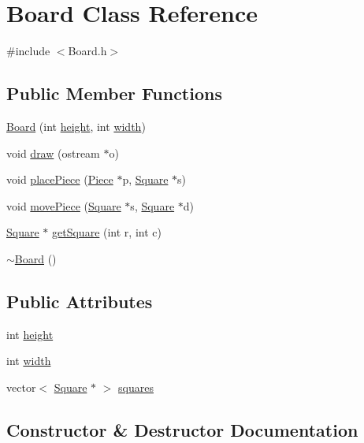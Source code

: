 \hypertarget{classBoard}{}\section{Board Class Reference}
\label{classBoard}


{\ttfamily \#include $<$Board.\+h$>$}

\subsection*{Public Member Functions}
\begin{DoxyCompactItemize}
\item 
\hyperlink{classBoard_a1291ca893864123e2a144ce5e4d8beb3}{Board} (int \hyperlink{classBoard_aa0cb8de0254520dc08dab5796643c8e5}{height}, int \hyperlink{classBoard_a90a8efaa4736af25511ac948bdd27d6c}{width})
\item 
void \hyperlink{classBoard_a07010bc149d198961c4669cec2ca4905}{draw} (ostream $\ast$o)
\item 
void \hyperlink{classBoard_ab96f988bdac00e84aa3ae9995e16921c}{place\+Piece} (\hyperlink{classPiece}{Piece} $\ast$p, \hyperlink{classSquare}{Square} $\ast$s)
\item 
void \hyperlink{classBoard_a71bbcd990439137e81b14ab229787daa}{move\+Piece} (\hyperlink{classSquare}{Square} $\ast$s, \hyperlink{classSquare}{Square} $\ast$d)
\item 
\hyperlink{classSquare}{Square} $\ast$ \hyperlink{classBoard_afa30630891e15327329bd1fb62de3484}{get\+Square} (int r, int c)
\item 
\hyperlink{classBoard_af73f45730119a1fd8f6670f53f959e68}{$\sim$\+Board} ()
\end{DoxyCompactItemize}
\subsection*{Public Attributes}
\begin{DoxyCompactItemize}
\item 
int \hyperlink{classBoard_aa0cb8de0254520dc08dab5796643c8e5}{height}
\item 
int \hyperlink{classBoard_a90a8efaa4736af25511ac948bdd27d6c}{width}
\item 
vector$<$ \hyperlink{classSquare}{Square} $\ast$ $>$ \hyperlink{classBoard_a7a0a34a623e8fd5e350fdb31bd10f182}{squares}
\end{DoxyCompactItemize}


\subsection{Constructor \& Destructor Documentation}
\hypertarget{classBoard_a1291ca893864123e2a144ce5e4d8beb3}{}
